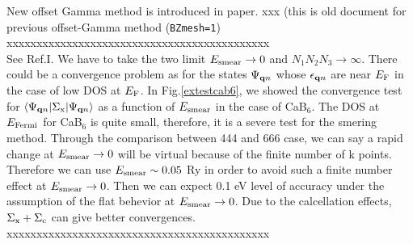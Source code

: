 \documentclass[a4paper,10pt,epsf,fleqn]{article}
\begin{document}
New offset Gamma method is introduced in paper. xxx
(this is old document for previous offset-Gamma method ({\tt BZmesh=1})\\
xxxxxxxxxxxxxxxxxxxxxxxxxxxxxxxxxxxxxxxxxxxx\\
See Ref.I. We have to take the two limit $E_{\rm smear} \to 0$ and
$N_1N_2N_3\to \infty$.
There could be a convergence problem as for
the states $\Psi_{{\bf q}n}$ whose $\epsilon_{{\bf q} n}$
are near $E_{\rm F}$ in the case of low DOS at $E_{\rm F}$.
In Fig.\ref{extestcab6}, we showed the convergence test
for $\langle \Psi_{{\bf q}n}|\Sigma_{\rm x} |\Psi_{{\bf q}n} \rangle$
as a function of $E_{\rm smear}$ in the case of CaB$_6$.
The DOS at $E_{\rm Fermi}$ for CaB$_6$ is quite small, therefore,
it is a severe test for the smering method.
Through the comparison between 444 and 666 case, 
we can say a rapid change at $E_{\rm smear}\to 0$ will be
virtual because of the finite number of k points.
Therefore we can use $E_{\rm smear} \sim 0.05$ Ry
in order to avoid such a finite number effect at $E_{\rm smear}\to 0$.
Then we can expect 0.1 eV level of accuracy under the assumption of the flat
behevior at $E_{\rm smear}\to 0$.
Due to the calcellation effects, $\Sigma_{\rm x} + \Sigma_{\rm c}$ can
give better convergences.\\
xxxxxxxxxxxxxxxxxxxxxxxxxxxxxxxxxxxxxxxxxxxx


\end{document}
